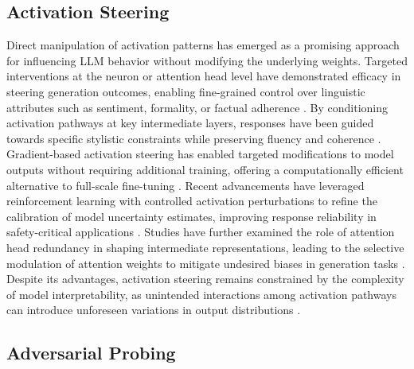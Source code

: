 \subsection{Activation Steering}

Direct manipulation of activation patterns has emerged as a promising approach for influencing LLM behavior without modifying the underlying weights. Targeted interventions at the neuron or attention head level have demonstrated efficacy in steering generation outcomes, enabling fine-grained control over linguistic attributes such as sentiment, formality, or factual adherence \cite{lodin2024dynamic}. By conditioning activation pathways at key intermediate layers, responses have been guided towards specific stylistic constraints while preserving fluency and coherence \cite{ kaufman2024dynamic}. Gradient-based activation steering has enabled targeted modifications to model outputs without requiring additional training, offering a computationally efficient alternative to full-scale fine-tuning \cite{wilson2024contextual}. Recent advancements have leveraged reinforcement learning with controlled activation perturbations to refine the calibration of model uncertainty estimates, improving response reliability in safety-critical applications \cite{cabeleireiro2024dynamic}. Studies have further examined the role of attention head redundancy in shaping intermediate representations, leading to the selective modulation of attention weights to mitigate undesired biases in generation tasks \cite{sawhai2024token}. Despite its advantages, activation steering remains constrained by the complexity of model interpretability, as unintended interactions among activation pathways can introduce unforeseen variations in output distributions \cite{ trissnow2024adaptive}.

\subsection{Adversarial Probing}

